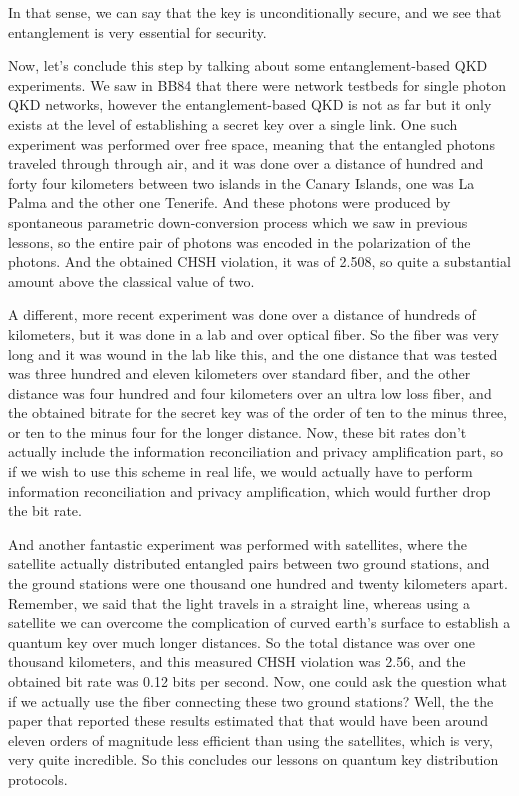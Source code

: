 In that sense, we can say that the key is unconditionally secure, and we see that entanglement is very essential for security.

Now, let's conclude this step by talking about some entanglement-based QKD experiments. We saw in BB84 that there were network testbeds for single photon QKD networks, however the entanglement-based QKD is not as far but it only exists at the level of establishing a secret key over a single link. One such experiment was performed over free space, meaning that the entangled photons traveled through through air, and it was done over a distance of hundred and forty four kilometers between two islands in the Canary Islands, one was La Palma and the other one Tenerife. And these photons were produced by spontaneous parametric down-conversion process which we saw in previous lessons, so the entire pair of photons was encoded in the polarization of the photons. And the obtained CHSH violation, it was of 2.508, so quite a substantial amount above the classical value of two.

A different, more recent experiment was done over a distance of hundreds of kilometers, but it was done in a lab and over optical fiber. So the fiber was very long and it was wound in the lab like this, and the one distance that was tested was three hundred and eleven kilometers over standard fiber, and the other distance was four hundred and four kilometers over an ultra low loss fiber, and the obtained bitrate for the secret key was of the order of ten to the minus three, or ten to the minus four for the longer distance. Now, these bit rates don't actually include the information reconciliation and privacy amplification part, so if we wish to use this scheme in real life, we would actually have to perform information reconciliation and privacy amplification, which would further drop the bit rate.

And another fantastic experiment was performed with satellites, where the satellite actually distributed entangled pairs between two ground stations, and the ground stations were one thousand one hundred and twenty kilometers apart. Remember, we said that the light travels in a straight line, whereas using a satellite we can overcome the complication of curved earth's surface to establish a quantum key over much longer distances. So the total distance was over one thousand kilometers, and this measured CHSH violation was 2.56, and the obtained bit rate was 0.12 bits per second. Now, one could ask the question what if we actually use the fiber connecting these two ground stations? Well, the the paper that reported these results estimated that that would have been around eleven orders of magnitude less efficient than using the satellites, which is very, very quite incredible. So this concludes our lessons on quantum key distribution protocols.

